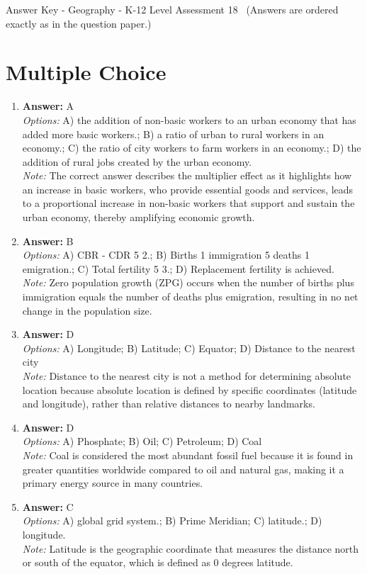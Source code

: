 \documentclass[12pt]{article}
\begin{document}
\begin{center}
Answer Key - Geography - K-12 Level Assessment 18 \
\small (Answers are ordered exactly as in the question paper.)
\end{center}

\section*{Multiple Choice}
\begin{enumerate}[label=\arabic*.]
\item \textbf{Answer:} A
\\ \textit{Options:} A) the addition of non-basic workers to an urban economy that has added more basic workers.; B) a ratio of urban to rural workers in an economy.; C) the ratio of city workers to farm workers in an economy.; D) the addition of rural jobs created by the urban economy.
\\ \textit{Note:} The correct answer describes the multiplier effect as it highlights how an increase in basic workers, who provide essential goods and services, leads to a proportional increase in non-basic workers that support and sustain the urban economy, thereby amplifying economic growth.
\item \textbf{Answer:} B
\\ \textit{Options:} A) CBR - CDR 5 2.; B) Births 1 immigration 5 deaths 1 emigration.; C) Total fertility 5 3.; D) Replacement fertility is achieved.
\\ \textit{Note:} Zero population growth (ZPG) occurs when the number of births plus immigration equals the number of deaths plus emigration, resulting in no net change in the population size.
\item \textbf{Answer:} D
\\ \textit{Options:} A) Longitude; B) Latitude; C) Equator; D) Distance to the nearest city
\\ \textit{Note:} Distance to the nearest city is not a method for determining absolute location because absolute location is defined by specific coordinates (latitude and longitude), rather than relative distances to nearby landmarks.
\item \textbf{Answer:} D
\\ \textit{Options:} A) Phosphate; B) Oil; C) Petroleum; D) Coal
\\ \textit{Note:} Coal is considered the most abundant fossil fuel because it is found in greater quantities worldwide compared to oil and natural gas, making it a primary energy source in many countries.
\item \textbf{Answer:} C
\\ \textit{Options:} A) global grid system.; B) Prime Meridian; C) latitude.; D) longitude.
\\ \textit{Note:} Latitude is the geographic coordinate that measures the distance north or south of the equator, which is defined as 0 degrees latitude.
\end{enumerate}
\end{document}
